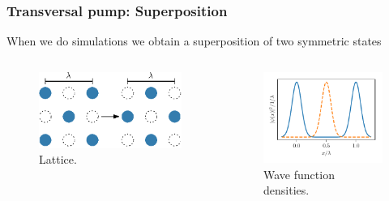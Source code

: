 \documentclass[pdflatex,compress]{beamer}
\begin{document}
\begin{frame}
\frametitle{Transversal pump: Superposition}
When we do simulations we obtain a superposition of two symmetric states
\begin{columns}
\begin{figure}
\centering
\includegraphics[width=1\textwidth]{images/lattice_drawing.eps}
\vspace*{-10mm}
\caption{Lattice.}
\end{figure}
\begin{figure}
\centering
\includegraphics[width=1\textwidth]{images/density_superposition.pdf}
\vspace*{-10mm}
\caption{Wave function densities.}
\end{figure}
\end{columns}
\end{frame}
\end{document}

